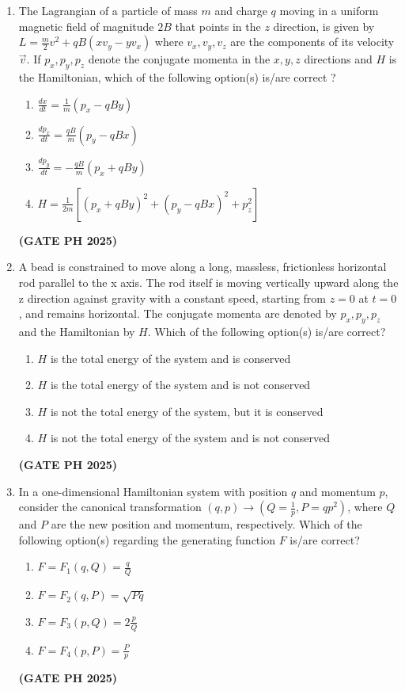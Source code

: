 \documentclass[14pt, a4paper]{extarticle}
\renewcommand{\vec}[1]{\overrightarrow{#1}}
\begin{document}
\begin{enumerate}[label=\textbf{Q.\arabic*}]
\item The Lagrangian of a particle of mass $m$ and charge $q$ moving in a uniform magnetic field of magnitude $2B$ that points in the $z$ direction, is given by $L = \frac{m}{2}v^2 + qB(xv_y - yv_x)$ where $v_x, v_y, v_z$ are the components of its velocity $\vec{v}$. If $p_x, p_y, p_z$ denote the conjugate momenta in the $x,y,z$ directions and $H$ is the Hamiltonian, which of the following option(s) is/are correct ?
\begin{enumerate}
\item $\frac{dx}{dt} = \frac{1}{m}(p_x - qBy)$
\item $\frac{dp_x}{dt} = \frac{qB}{m}(p_y - qBx)$
\item $\frac{dp_y}{dt} = -\frac{qB}{m}(p_x + qBy)$
\item $H = \frac{1}{2m}[(p_x + qBy)^2 + (p_y - qBx)^2 + p_z^2]$
\end{enumerate}
\hfill \textbf{(GATE PH 2025)}

\item A bead is constrained to move along a long, massless, frictionless horizontal rod parallel to the x axis. The rod itself is moving vertically upward along the z direction against gravity with a constant speed, starting from $z=0$ at $t=0$, and remains horizontal. The conjugate momenta are denoted by $p_x, p_y, p_z$ and the Hamiltonian by $H$. Which of the following option(s) is/are correct?
\begin{enumerate}
\item $H$ is the total energy of the system and is conserved
\item $H$ is the total energy of the system and is not conserved
\item $H$ is not the total energy of the system, but it is conserved
\item $H$ is not the total energy of the system and is not conserved
\end{enumerate}
\hfill \textbf{(GATE PH 2025)}

\item In a one-dimensional Hamiltonian system with position $q$ and momentum $p$, consider the canonical transformation $(q, p) \to (Q = \frac{1}{p}, P = qp^2)$, where $Q$ and $P$ are the new position and momentum, respectively. Which of the following option(s) regarding the generating function $F$ is/are correct?
\begin{enumerate}
\item $F = F_1(q,Q) = \frac{q}{Q}$
\item $F = F_2(q,P) = \sqrt{Pq}$
\item $F = F_3(p,Q) = 2\frac{p}{Q}$
\item $F = F_4(p,P) = \frac{P}{p}$
\end{enumerate}
\hfill \textbf{(GATE PH 2025)}


\end{enumerate}
\end{document}
